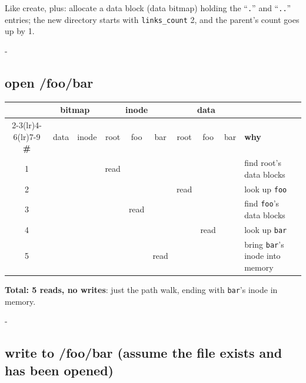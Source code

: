 \documentclass[11pt,a4paper]{article}
\makeatletter
\newcommand{\keepspace}[1]{\par\penalty-100\begingroup
  \setlength{\dimen@}{#1}\dimen@ii\pagegoal\advance\dimen@ii-\pagetotal
  \ifdim\dimen@>\dimen@ii\ifdim\dimen@ii>\z@\vfil\fi\break\fi\endgroup}
\makeatother
\begin{document}
\begin{keybox}
Like create, plus: allocate a data block (data bitmap) holding the
``\texttt{.}'' and ``\texttt{..}'' entries; the new directory starts with
\texttt{links\_count} 2, and the parent's count goes up by 1.
\end{keybox}

\keepspace{8\baselineskip}
\subsection{open /foo/bar}

\begin{center}
\small
\setlength{\tabcolsep}{3.5pt}
\renewcommand{\arraystretch}{1.18}
\begin{tabularx}{\linewidth}{@{}c*{8}{c}X@{}}
  \toprule
  & \multicolumn{2}{c}{\textbf{bitmap}} & \multicolumn{3}{c}{\textbf{inode}} & \multicolumn{3}{c}{\textbf{data}} & \\
  \cmidrule(lr){2-3}\cmidrule(lr){4-6}\cmidrule(lr){7-9}
  \textbf{\#} & data & inode & root & foo & bar & root & foo & bar & \textbf{why} \\
  \midrule
  1 &  &  & read &  &  &  &  &  & find root's data blocks \\
  2 &  &  &  &  &  & read &  &  & look up \texttt{foo} \\
  3 &  &  &  & read &  &  &  &  & find \texttt{foo}'s data blocks \\
  4 &  &  &  &  &  &  & read &  & look up \texttt{bar} \\
  5 &  &  &  &  & read &  &  &  & bring \texttt{bar}'s inode into memory \\
  \bottomrule
\end{tabularx}
\end{center}

\noindent\textbf{Total: 5 reads, no writes}: just the path walk, ending with
\texttt{bar}'s inode in memory.

\keepspace{8\baselineskip}
\subsection{write to /foo/bar (assume the file exists and has been opened)}
\end{document}
